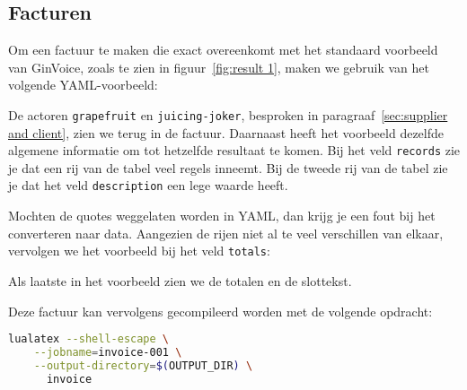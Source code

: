 \subsection{Facturen}

    Om een factuur te maken die exact overeenkomt met het standaard voorbeeld van GinVoice, zoals te zien in figuur~\ref{fig:result 1}, maken we gebruik van het volgende YAML-voorbeeld:
    
    De actoren \texttt{grapefruit} en \texttt{juicing-joker}, besproken in paragraaf~\ref{sec:supplier and client}, zien we terug in de factuur.
    Daarnaast heeft het voorbeeld dezelfde algemene informatie om tot hetzelfde resultaat te komen.
    Bij het veld \texttt{records} zie je dat een rij van de tabel veel regels inneemt.
    Bij de tweede rij van de tabel zie je dat het veld \texttt{description} een lege waarde heeft.

    Mochten de quotes weggelaten worden in YAML, dan krijg je een fout bij het converteren naar data.
    Aangezien de rijen niet al te veel verschillen van elkaar, vervolgen we het voorbeeld bij het veld \texttt{totals}:
    
    
    Als laatste in het voorbeeld zien we de totalen en de slottekst.

    Deze factuur kan vervolgens gecompileerd worden met de volgende opdracht:
    \begin{lstlisting}[language=bash]
lualatex --shell-escape \
    --jobname=invoice-001 \
    --output-directory=$(OUTPUT_DIR) \
      invoice
    \end{lstlisting}

